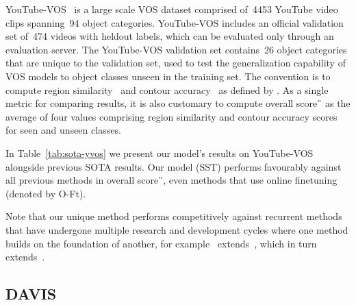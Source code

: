 YouTube-VOS~\citep{xu2018youtubevos} is a large scale VOS dataset comprised
of~\num{4453} YouTube video clips spanning~\num{94} object categories.
YouTube-VOS includes an official validation set of~\num{474} videos with
heldout labels, which can be evaluated only through an evaluation server.
The YouTube-VOS validation set contains~\num{26} object categories that are
unique to the validation set, used to test the generalization capability of VOS
models to object classes unseen in the training set.
The convention is to compute region similarity~\J{} and contour accuracy~\F{}
as defined by \citet{perazzi2016abenchmark}.
As a single metric for comparing results, it is also customary to compute
overall score~\G{} as the average of four values comprising region similarity
and contour accuracy scores for seen and unseen classes.

In Table~\ref{tab:sota-yvos} we present our model's results on YouTube-VOS
alongside previous SOTA results.
Our model (SST) performs favourably against all previous methods in overall
score~\G{}, even methods that use online finetuning (denoted by O-Ft).

Note that our unique method performs competitively against recurrent methods
that have undergone multiple research and development cycles where one method
builds on the foundation of another, for
example~\citet{johnander2019agenerative} extends~\citet{oh2018fast}, which in
turn extends~\citet{khoreva2017learning}.


\subsection{DAVIS}

